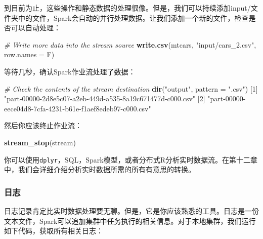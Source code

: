 \documentclass[
]{article}
\newenvironment{Shaded}{\begin{snugshade}}{\end{snugshade}}
\newcommand{\CommentTok}[1]{\textcolor[rgb]{0.56,0.35,0.01}{\textit{#1}}}
\newcommand{\DataTypeTok}[1]{\textcolor[rgb]{0.13,0.29,0.53}{#1}}
\newcommand{\DecValTok}[1]{\textcolor[rgb]{0.00,0.00,0.81}{#1}}
\newcommand{\KeywordTok}[1]{\textcolor[rgb]{0.13,0.29,0.53}{\textbf{#1}}}
\newcommand{\NormalTok}[1]{#1}
\newcommand{\StringTok}[1]{\textcolor[rgb]{0.31,0.60,0.02}{#1}}
\begin{document}
到目前为止，这些操作和静态数据的处理很像。但是，我们可以持续添加input/文件夹中的文件，Spark会自动的并行处理数据。让我们添加一个新的文件，检查是否可以自动处理：

\begin{Shaded}
\begin{Highlighting}[]
\CommentTok{# Write more data into the stream source}
\KeywordTok{write.csv}\NormalTok{(mtcars, }\StringTok{"input/cars_2.csv"}\NormalTok{, }\DataTypeTok{row.names =}\NormalTok{ F)}
\end{Highlighting}
\end{Shaded}

等待几秒，确认Spark作业流处理了数据：

\begin{Shaded}
\begin{Highlighting}[]
\CommentTok{# Check the contents of the stream destination}
\KeywordTok{dir}\NormalTok{(}\StringTok{"output"}\NormalTok{, }\DataTypeTok{pattern =} \StringTok{".csv"}\NormalTok{)}
\NormalTok{[}\DecValTok{1}\NormalTok{] }\StringTok{"part-00000-2d8e5c07-a2eb-449d-a535-8a19c671477d-c000.csv"}
\NormalTok{[}\DecValTok{2}\NormalTok{] }\StringTok{"part-00000-eece04d8-7cfa-4231-b61e-f1aef8edeb97-c000.csv"}
\end{Highlighting}
\end{Shaded}

然后你应该终止作业流：

\begin{Shaded}
\begin{Highlighting}[]
\KeywordTok{stream_stop}\NormalTok{(stream)}
\end{Highlighting}
\end{Shaded}

你可以使用\texttt{dplyr}，SQL，Spark模型，或者分布式R分析实时数据流。在第十二章中，我们会详细介绍分析实时数据所需的所有有意思的转换。

\hypertarget{ux65e5ux5fd7}{%
\subsubsection{日志}\label{ux65e5ux5fd7}}

日志记录肯定比实时数据处理要无聊。但是，它是你应该熟悉的工具。日志是一份文本文件，Spark可以追加集群中任务执行的相关信息。对于本地集群，我们运行如下代码，获取所有相关日志：
\end{document}
